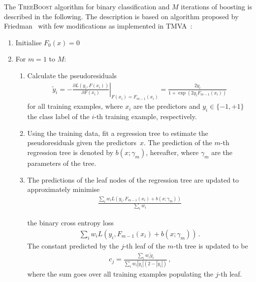 The \textsc{TreeBoost} algorithm for binary classification and $M$ iterations of
boosting is described in the following. The description is based on algorithm
proposed by Friedman~\cite{Friedman:2001wbq} with few modifications as
implemented in TMVA~\cite{TMVA}:
\begin{enumerate}
  \setlength{\itemsep}{0pt}

\item Initialise $F_0(x) = 0$

\item For $m = 1$ to $M$:
  \begin{enumerate}
    \setlength{\itemsep}{0pt}

  \item Calculate the pseudoresiduals
    \begin{align*}
      \tilde{y}_i
      = - \left. \frac{\partial L(y_i, F(x_i))}{\partial F(x_i)}\right|_{F(x_i) = F_{m - 1}(x_i)}
      = \frac{2 y_i}{1 + \exp(2 y_i F_{m-1}(x_i))}
    \end{align*}
    for all training examples, where $x_i$ are the predictors and
    $y_i \in \{ -1, +1 \}$ the class label of the $i$-th training example,
    respectively.

  \item Using the training data, fit a regression tree to estimate the
    pseudoresiduals given the predictors~$x$. The prediction of the $m$-th
    regression tree is denoted by $b(x; \gamma_{m})$, hereafter, where
    $\gamma_{m}$ are the parameters of the tree.

  \item The predictions of the leaf nodes of the regression tree are updated to
    approximately minimise
    \begin{align*}
      \frac{ \sum_i w_i L(y_i, F_{m - 1}(x_i) + b(x; \gamma_{m})) }{ \sum_i w_i }
    \end{align*}


    the binary cross entropy loss
    \begin{align*}
      \sum_i w_i L(y_i, F_{m - 1}(x_i) + b(x; \gamma_{m})) \,\text{.}
    \end{align*}
    The constant predicted by the $j$-th leaf of the $m$-th tree is updated to
    be
    \begin{align*}
      c_{j} = \frac{ \sum_i w_i \tilde{y}_i }{ \sum_i w_i |\tilde{y}_i| (2 - |\tilde{y}_i|)} \,\text{,}
    \end{align*}
    where the sum goes over all training examples populating the $j$-th leaf.


\end{enumerate}
\end{enumerate}
